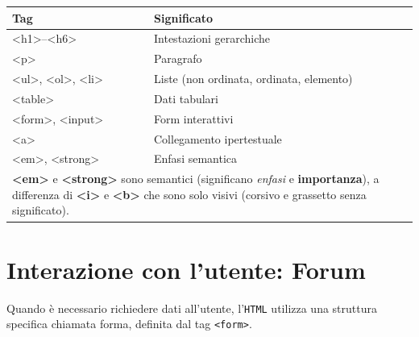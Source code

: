 \begin{table}[htbp]
    \centering
    \renewcommand{\arraystretch}{1.5} %
    
    \begin{tabularx}{\textwidth}{|l|X|}
        \hline
        \textbf{Tag} & \textbf{Significato} \\ \hline
        
        \textless h1\textgreater--\textless h6\textgreater & Intestazioni gerarchiche \\ \hline
        
        \textless p\textgreater & Paragrafo \\ \hline
        
        \textless ul\textgreater, \textless ol\textgreater, \textless li\textgreater & Liste (non ordinata, ordinata, elemento) \\ \hline
        
        \textless table\textgreater & Dati tabulari \\ \hline
        
        \textless form\textgreater, \textless input\textgreater & Form interattivi \\ \hline
        
        \textless a\textgreater & Collegamento ipertestuale \\ \hline
        
        \textless em\textgreater, \textless strong\textgreater & Enfasi semantica \\ \hline
        
        \multicolumn{2}{|p{\dimexpr\textwidth-2\tabcolsep-2\arrayrulewidth}|}{
            \small \textbf{\textless em\textgreater} e \textbf{\textless strong\textgreater} sono semantici (significano \emph{enfasi} e \textbf{importanza}), a differenza di \textbf{\textless i\textgreater} e \textbf{\textless b\textgreater} che sono solo visivi (corsivo e grassetto senza significato).
        } \\ \hline
    \end{tabularx}
\end{table}

\newpage

\section{Interazione con l'utente: Forum}
Quando è necessario richiedere dati all'utente, l'\texttt{HTML} utilizza una struttura specifica chiamata forma, definita dal tag \texttt{<form>}.

